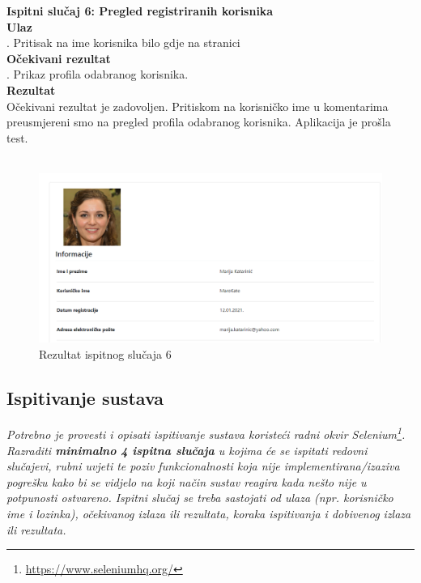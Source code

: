 {			\noindent \textbf{Ispitni slučaj 6: Pregled registriranih korisnika}
			\\
			\textbf{Ulaz}
			\\
			. Pritisak na ime korisnika bilo gdje na stranici \\
			\textbf{Očekivani rezultat}
			\\
			. Prikaz profila odabranog korisnika. \\
			\textbf{Rezultat}
			\\
			\indent Očekivani rezultat je zadovoljen. Pritiskom na korisničko ime u komentarima preusmjereni smo na pregled profila odabranog korisnika. Aplikacija je prošla test.
			\\ \\
			\begin{figure}[H]
				\centering
				\includegraphics[scale=0.34]{"slike/test6"}
				\caption{Rezultat ispitnog slučaja 6}
				\label{fig:rezultat-ispitnog-slucaja-6}
			\end{figure}
			
			
			\subsection{Ispitivanje sustava}
			
			 \textit{Potrebno je provesti i opisati ispitivanje sustava koristeći radni okvir Selenium\footnote{\url{https://www.seleniumhq.org/}}. Razraditi \textbf{minimalno 4 ispitna slučaja} u kojima će se ispitati redovni slučajevi, rubni uvjeti te poziv funkcionalnosti koja nije implementirana/izaziva pogrešku kako bi se vidjelo na koji način sustav reagira kada nešto nije u potpunosti ostvareno. Ispitni slučaj se treba sastojati od ulaza (npr. korisničko ime i lozinka), očekivanog izlaza ili rezultata, koraka ispitivanja i dobivenog izlaza ili rezultata.\\ }
			 
}
